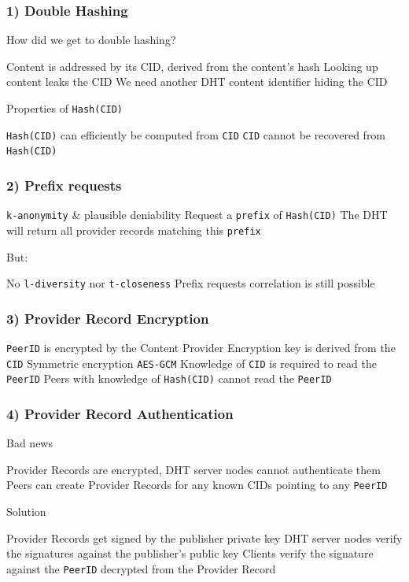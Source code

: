 \documentclass{pl-slide}
\begin{document}
\begin{frame}
\frametitle{1) Double Hashing}
{\Large How did we get to double hashing?}
\begin{itemize}
	\itemc Content is addressed by its CID, derived from the content's hash
	\itemc Looking up content leaks the CID
	\itemc We need another DHT content identifier hiding the CID
\end{itemize}
\bigskip

{\Large Properties of \texttt{Hash(CID)}}
\begin{itemize}
	\itemc \texttt{Hash(CID)} can efficiently be computed from \texttt{CID}
	\itemc \texttt{CID} cannot be recovered from \texttt{Hash(CID)}
\end{itemize}
\end{frame}

\begin{frame}
\frametitle{2) Prefix requests}
\begin{itemize}
	\itemc \texttt{k-anonymity} \& plausible deniability
	\itemc Request a \texttt{prefix} of \texttt{Hash(CID)}
	\itemc The DHT will return all provider records matching this \texttt{prefix}
\end{itemize}
{\large But:}
\begin{itemize}
	\itemc No \texttt{l-diversity} nor \texttt{t-closeness}
	\itemc Prefix requests correlation is still possible
\end{itemize}
\end{frame}

\begin{frame}
\frametitle{3) Provider Record Encryption}
\begin{itemize}
	\itemc \texttt{PeerID} is encrypted by the Content Provider
	\itemc Encryption key is derived from the \texttt{CID}
	\itemc Symmetric encryption \texttt{AES-GCM}
	\itemc Knowledge of \texttt{CID} is required to read the \texttt{PeerID}
	\itemc Peers with knowledge of \texttt{Hash(CID)} cannot read the \texttt{PeerID} 
\end{itemize}
\end{frame}

\begin{frame}
\frametitle{4) Provider Record Authentication}
{\Large Bad news}
\begin{itemize}
	\itemc Provider Records are encrypted, DHT server nodes cannot authenticate them
	\itemc Peers can create Provider Records for any known CIDs pointing to any \texttt{PeerID}
\end{itemize}
\bigskip
{\Large Solution}
\begin{itemize}
	\itemc Provider Records get signed by the publisher private key
	\itemc DHT server nodes verify the signatures against the publisher's public key
	\itemc Clients verify the signature against the \texttt{PeerID} decrypted from the Provider Record
\end{itemize}
\end{frame}
\end{document}
